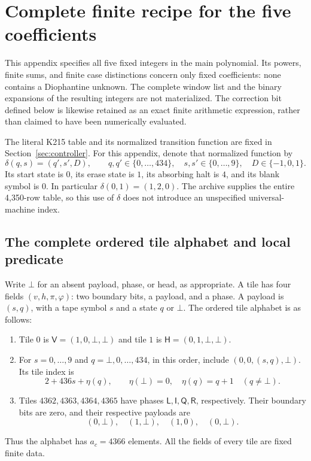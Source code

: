 \section{Complete finite recipe for the five coefficients}
\label{app:coefficient-recipe}

This appendix specifies all five fixed integers in the main polynomial.
Its powers, finite sums, and finite case distinctions concern only fixed
coefficients: none contains a Diophantine unknown. The complete window
list and the binary expansions of the resulting integers are not
materialized. The correction bit defined below is likewise retained as
an exact finite arithmetic expression, rather than claimed to have been
numerically evaluated.

The literal K215 table and its normalized transition function are fixed
in Section~\ref{sec:controller}. For this appendix, denote that normalized
function by
\[
 \delta(q,s)=(q',s',D),\qquad
 q,q'\in\{0,\ldots,434\},\quad
 s,s'\in\{0,\ldots,9\},\quad D\in\{-1,0,1\}.
\]
Its start state is $0$, its erase state is $1$, its absorbing halt is $4$,
and its blank symbol is $0$. In particular $\delta(0,1)=(1,2,0)$.
The archive supplies the entire 4,350-row table, so this use of $\delta$
does not introduce an unspecified universal-machine index.

\subsection{The complete ordered tile alphabet and local predicate}
\label{app:tile-predicate}

Write $\bot$ for an absent payload, phase, or head, as appropriate.
A tile has four fields $(v,h,\pi,\varphi)$: two boundary bits, a payload,
and a phase. A payload is $(s,q)$, with a tape symbol $s$ and a state
$q$ or $\bot$. The ordered tile alphabet is as follows:
\begin{enumerate}
\item Tile $0$ is $\mathsf V=(1,0,\bot,\bot)$ and tile $1$ is
$\mathsf H=(0,1,\bot,\bot)$.
\item For $s=0,\ldots,9$ and $q=\bot,0,\ldots,434$, in this order,
include $(0,0,(s,q),\bot)$. Its tile index is
\[
 2+436s+\eta(q),\qquad
 \eta(\bot)=0,\quad \eta(q)=q+1\quad(q\ne\bot).
\]
\item Tiles $4362,4363,4364,4365$ have phases
$\mathsf L,\mathsf I,\mathsf Q,\mathsf R$, respectively. Their boundary
bits are zero, and their respective payloads are
\[
 (0,\bot),\quad(1,\bot),\quad(1,0),\quad(0,\bot).
\]
\end{enumerate}
Thus the alphabet has $a_c=4366$ elements. All the fields of every tile
are fixed finite data.

